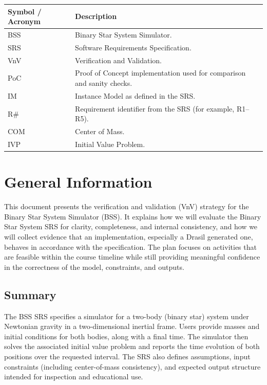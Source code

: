\documentclass[12pt, titlepage]{article}
\begin{document}
\renewcommand{\arraystretch}{1.2}
\begin{tabularx}{\textwidth}{l X}
  \toprule
  \textbf{Symbol / Acronym} & \textbf{Description}\\
  \midrule
  BSS & Binary Star System Simulator.\\
  SRS & Software Requirements Specification.\\
  VnV & Verification and Validation.\\
  PoC & Proof of Concept implementation used for comparison and sanity checks.\\
  IM & Instance Model as defined in the SRS.\\
  R\# & Requirement identifier from the SRS (for example, R1--R5).\\
  COM & Center of Mass.\\
  IVP & Initial Value Problem.\\
   \bottomrule
\end{tabularx}

\newpage



\section{General Information}

This document presents the verification and validation (VnV) strategy for the
Binary Star System Simulator (BSS). It explains how we will evaluate the Binary
Star System SRS \cite{SRS} for clarity, completeness, and internal consistency, and how we
will collect evidence that an implementation, especially a Drasil generated one,
behaves in accordance with the specification. The plan focuses on activities
that are feasible within the course timeline while still providing meaningful
confidence in the correctness of the model, constraints, and outputs.

\subsection{Summary}

The BSS SRS \cite{SRS} specifies a simulator for a two-body (binary star) system under
Newtonian gravity in a two-dimensional inertial frame. Users provide masses and
initial conditions for both bodies, along with a final time. The simulator then
solves the associated initial value problem and reports the time evolution of
both positions over the requested interval. The SRS also defines assumptions,
input constraints (including center-of-mass consistency), and expected output
structure intended for inspection and educational use.
\end{document}
